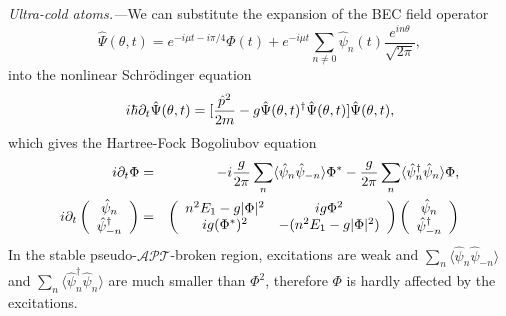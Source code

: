 \documentclass[twocolumn,prl,floatfix,citeautoscript,nofootinbib,superscriptaddress]{revtex4}
\begin{document}
\begin{widetext}
\emph{{\color{blue}Ultra-cold atoms}.---}We can substitute the expansion of
the BEC field operator
\begin{equation}
\hat{\Psi}(\theta ,t)=e^{-i\mu t-i\pi /4}\Phi (t)+e^{-i\mu t}\sum_{n\neq 0}%
\hat{\psi}_{n}(t)\frac{e^{in\theta }}{\sqrt{2\pi }},  \label{eq:fieldS}
\end{equation}%
into the nonlinear Schr\"{o}dinger equation
\begin{equation}
i\hbar \partial _{t}\hat{\Psi}(\theta ,t)=[\frac{\hat{p}^{2}}{2m}-{g}\hat{%
\Psi}(\theta ,t)^{\dag }\hat{\Psi}(\theta ,t)]\hat{\Psi}(\theta ,t),
\label{eq:nlseS}
\end{equation}%
which gives the Hartree-Fock Bogoliubov equation
\begin{eqnarray}
i\partial _{t}{\Phi } &=&-i\frac{g}{2\pi }\sum_{n}\langle \hat{\psi}_{n}\hat{%
\psi}_{-n}\rangle \Phi ^{\ast }-\frac{g}{2\pi }\sum_{n}\langle \hat{\psi}%
_{n}^{\dag }\hat{\psi}_{n}\rangle \Phi ,  \label{eq:HFbdg1} \\
i\partial _{t}\left(
\begin{array}{c}
\hat{\psi}_{n} \\
\hat{\psi}_{-n}^{\dag }%
\end{array}%
\right) &=&\left(
\begin{array}{cc}
n^{2}E_{1}-g|\Phi |^{2} & ig\Phi ^{2} \\
ig(\Phi ^{\ast })^{2} & -(n^{2}E_{1}-g|\Phi |^{2})%
\end{array}%
\right) \left(
\begin{array}{c}
\hat{\psi}_{n} \\
\hat{\psi}_{-n}^{\dag }%
\end{array}%
\right)  \label{eq:HFbdg2}
\end{eqnarray}%
In the stable pseudo-$\mathcal{APT}$-broken region, excitations are weak and
$\sum_{n}\langle \hat{\psi}_{n}\hat{\psi}_{-n}\rangle $ and $\sum_{n}\langle
\hat{\psi}_{n}^{\dag }\hat{\psi}_{n}\rangle $ are much smaller than $\Phi
^{2}$, therefore $\Phi $ is hardly affected by the excitations.


\end{widetext}
\end{document}
